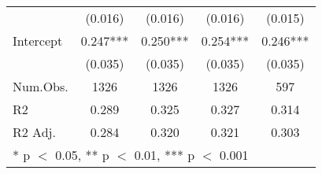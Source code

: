 \begin{table}
\begin{tabular}[t]{lcccc}
 & (0.016) & (0.016) & (0.016) & (0.015)\\
Intercept & 0.247*** & 0.250*** & 0.254*** & 0.246***\\
 & (0.035) & (0.035) & (0.035) & (0.035)\\
\midrule
Num.Obs. & 1326 & 1326 & 1326 & 597\\
R2 & 0.289 & 0.325 & 0.327 & 0.314\\
R2 Adj. & 0.284 & 0.320 & 0.321 & 0.303\\
\bottomrule
\multicolumn{5}{l}{\rule{0pt}{1em}* p $<$ 0.05, ** p $<$ 0.01, *** p $<$ 0.001}\\
\end{tabular}
\end{table}
